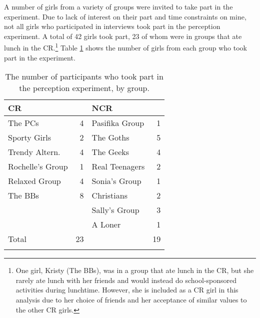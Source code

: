 A number of girls from a variety of groups were invited to take part in the experiment.  Due to lack of interest on their part and time constraints on mine, not all girls who participated in interviews took part in the perception experiment.  A total of 42 girls took part, 23 of whom were in groups that ate lunch in the CR.\footnote{One girl, Kristy (The BBs), was in a group that ate lunch in the CR, but she rarely ate lunch with her friends and would instead do school-sponsored activities during lunchtime.  However, she is included as a CR girl in this analysis due to her choice of friends and her acceptance of similar values to the other CR girls.}  Table \ref{groupsperc} shows the number of girls from each group who took part in the experiment.

\begin{table}[htbp]
\caption{The number of participants who took part in the perception experiment, by group.}	
	\label{groupsperc}
	 \begin{center}
		\begin{tabular}{lrlr}\hline
	          
          
CR & &NCR& \\
  \hline
The PCs&  4    	&Pasifika Group& 1 \\
Sporty Girls& 2 &The Goths& 5 \\
Trendy Altern.&4&The Geeks& 4 \\
Rochelle's Group& 1 &Real Teenagers& 2\\
Relaxed Group& 4&Sonia's Group&1 \\
The BBs&8      	&Christians&2\\
     &         	&Sally's Group & 3 \\
     & 					&A Loner & 1 \\
     Total &  23&        &   19 \\
\\ \hline
		\end{tabular}
	
	\end{center}
\end{table}


